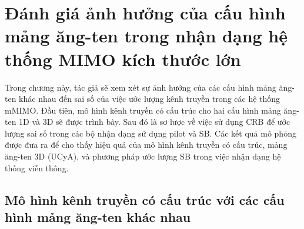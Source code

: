 \clearpage
{}

\setcounter{chapter}{1}
\chapter[{ĐÁNH GIÁ ẢNH HƯỞNG CỦA CẤU HÌNH MẢNG ĂNG-TEN TRONG NHẬN DẠNG HỆ THỐNG MIMO KÍCH THƯỚC LỚN}]{Đánh giá ảnh hưởng của cấu hình mảng ăng-ten trong nhận dạng hệ thống MIMO kích thước lớn}
\label{sec:CRB}

Trong chương này, tác giả sẽ xem xét sự ảnh hưởng của các cấu hình mảng ăng-ten khác nhau đến sai số của việc ước lượng kênh truyền trong các hệ thống mMIMO. Đầu tiên, mô hình kênh truyền có cấu trúc cho hai cấu hình mảng ăng-ten 1D và 3D sẽ được trình bày. Sau đó là sơ lược về việc sử dụng CRB để ước lượng sai số trong các bộ nhận dạng sử dụng pilot và SB. Các kết quả mô phỏng được đưa ra để cho thấy hiệu quả của mô hình kênh truyền có cấu trúc, mảng ăng-ten 3D (UCyA), và phương pháp ước lượng SB trong việc nhận dạng hệ thống viễn thông.

\section{Mô hình kênh truyền có cấu trúc với các cấu hình mảng ăng-ten khác nhau}\label{SM}


